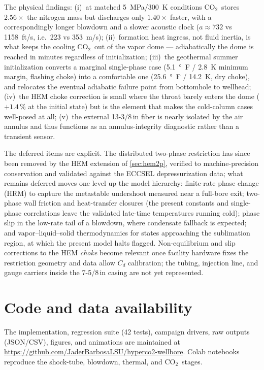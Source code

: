 \documentclass[11pt]{article}
\newcommand{\co}{CO$_2$}
\begin{document}
The physical findings: (i)~at matched \SI{5}{MPa}/\SI{300}{K}
conditions \co\ stores $2.56\times$ the nitrogen mass but discharges
only $1.40\times$ faster, with a correspondingly longer blowdown and
a slower acoustic clock ($a \approx 732$ vs \SI{1158}{ft/s}, i.e.\
223 vs \SI{353}{m/s});
(ii)~formation heat ingress, not fluid inertia, is what keeps the
cooling \co\ out of the vapor dome --- adiabatically the dome is
reached in minutes regardless of initialization; (iii)~the
geothermal summer initialization converts a marginal single-phase
case (\SI{5.1}{\degree F} / \SI{2.8}{K} minimum margin, flashing
choke) into a comfortable one (\SI{25.6}{\degree F} / \SI{14.2}{K},
dry choke), and relocates the eventual adiabatic failure point from
bottomhole to wellhead; (iv)~the HEM choke
correction is small where the throat barely enters the dome
($+1.4\,\%$ at the initial state) but is the element that makes the
cold-column cases well-posed at all; (v)~the external 13-3/8\,in
fiber is nearly isolated by the air annulus and thus functions as an
annulus-integrity diagnostic rather than a transient sensor.

The deferred items are explicit. The distributed two-phase
restriction has since been removed by the HEM extension of
\cref{sec:hem2p}, verified to machine-precision conservation and
validated against the ECCSEL depressurization data; what remains
deferred moves one level up the model hierarchy: finite-rate phase
change (HRM) to capture the metastable undershoot measured near a
full-bore exit; two-phase wall friction and heat-transfer closures
(the present constants and single-phase correlations leave the
validated late-time temperatures running cold); phase slip in the
low-rate tail of a blowdown, where condensate fallback is expected;
and vapor--liquid--solid thermodynamics for states approaching the
sublimation region, at which the present model halts flagged.
Non-equilibrium and slip corrections to the HEM \emph{choke} become
relevant once facility hardware fixes the restriction geometry and
data allow $C_d$ calibration; the tubing, injection line, and gauge
carriers inside the 7-5/8\,in casing are not yet represented.

\section*{Code and data availability}
\label{sec:code}
The implementation, regression suite (42 tests), campaign drivers,
raw outputs (JSON/CSV), figures, and animations are maintained at
\url{https://github.com/JaderBarbosaLSU/hyperco2-wellbore}. Colab
notebooks reproduce the shock-tube, blowdown, thermal, and \co\
stages.
\end{document}
